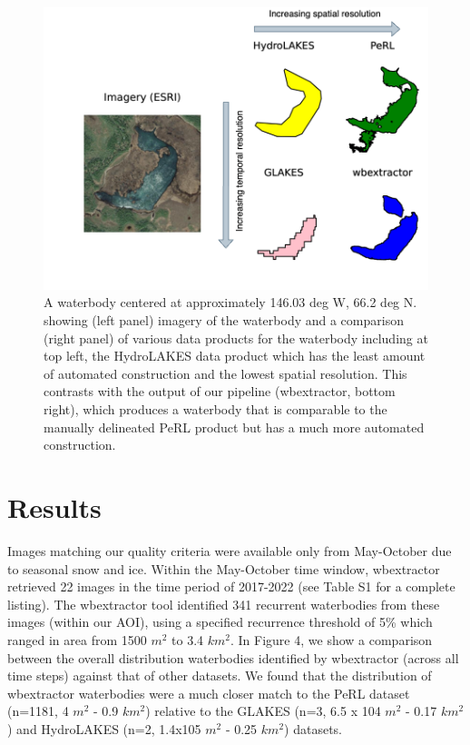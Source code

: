 \documentclass{article}
\begin{document}
\begin{figure}
	\centering
	\includegraphics[width=12cm]{../figures/single_wb.drawio.png}
	\caption{A waterbody centered at approximately 146.03 deg W, 66.2 deg N. showing (left panel) imagery of the waterbody and a comparison (right panel) of various data products for the waterbody including at top left, the HydroLAKES data product which has the least amount of automated construction and the lowest spatial resolution. This contrasts with the output of our pipeline (wbextractor, bottom right), which produces a waterbody that is comparable to the manually delineated PeRL product but has a much more automated construction.}
	\label{fig:single_wb}
\end{figure}

\section{Results}

Images matching our quality criteria were available only from May-October due to seasonal snow and ice. Within the May-October time window, wbextractor retrieved 22 images in the time period of 2017-2022 (see Table S1 for a complete listing). The wbextractor tool identified 341 recurrent waterbodies from these images (within our AOI), using a specified recurrence threshold of 5\% which ranged in area from 1500 $m^2$ to 3.4 $km^2$. In Figure 4, we show a comparison between the overall distribution waterbodies identified by wbextractor (across all time steps) against that of other datasets. We found that the distribution of wbextractor waterbodies were a much closer match to the PeRL dataset (n=1181, 4 $m^2$ - 0.9 $km^2$) relative to the GLAKES (n=3, 6.5 x 104 $m^2$ - 0.17 $km^2$) and HydroLAKES (n=2, 1.4x105 $m^2$ - 0.25 $km^2$) datasets.
\end{document}

